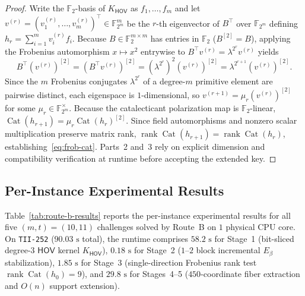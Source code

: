 \documentclass[11pt,a4paper]{article}
\theoremstyle{definition}
\theoremstyle{remark}
\newcommand{\F}{\mathbb{F}}
\newcommand{\rk}{\operatorname{rank}}
\newcommand{\Cat}{\operatorname{Cat}}
\newcommand{\HOV}{\mathsf{HOV}}
\begin{document}
\begin{proof}
Write the $\F_2$-basis of $K_{\HOV}$ as $f_1, \dots, f_m$ and let $v^{(r)} = (v^{(r)}_1, \dots, v^{(r)}_m)^\top \in \F_{2^m}^m$ be the $r$-th eigenvector of $B^\top$ over $\F_{2^m}$ defining $h_r = \sum_{i=1}^m v^{(r)}_i f_i$. Because $B \in \F_2^{m \times m}$ has entries in $\F_2$ ($B^{[2]} = B$), applying the Frobenius automorphism $x \mapsto x^2$ entrywise to $B^\top v^{(r)} = \lambda^{2^r} v^{(r)}$ yields
\[
    B^\top (v^{(r)})^{[2]} = (B^\top v^{(r)})^{[2]} = (\lambda^{2^r})^2 (v^{(r)})^{[2]} = \lambda^{2^{r+1}} (v^{(r)})^{[2]}.
\]
Since the $m$ Frobenius conjugates $\lambda^{2^r}$ of a degree-$m$ primitive element are pairwise distinct, each eigenspace is $1$-dimensional, so $v^{(r+1)} = \mu_r (v^{(r)})^{[2]}$ for some $\mu_r \in \F_{2^m}^\times$. Because the catalecticant polarization map is $\F_2$-linear, $\Cat(h_{r+1}) = \mu_r \Cat(h_r)^{[2]}$. Since field automorphisms and nonzero scalar multiplication preserve matrix rank, $\rk\Cat(h_{r+1}) = \rk\Cat(h_r)$, establishing~\eqref{eq:frob-cat}. Parts~2 and~3 rely on explicit dimension and compatibility verification at runtime before accepting the extended key.
\end{proof}

\subsection{Per-Instance Experimental Results}
Table~\ref{tab:route-b-results} reports the per-instance experimental results for all five $(m, t) = (10, 11)$ challenges solved by Route~B on $1$ physical CPU core. On \texttt{TII-252} ($90.03\text{ s}$ total), the runtime comprises $58.2\text{ s}$ for Stage~1 (bit-sliced degree-$3$ $\HOV$ kernel $K_{\HOV}$), $0.18\text{ s}$ for Stage~2 ($1\text{--}2$ block incremental $E_\beta$ stabilization), $1.85\text{ s}$ for Stage~3 (single-direction Frobenius rank test $\rk\Cat(h_0) = 9$), and $29.8\text{ s}$ for Stages~4--5 ($450$-coordinate fiber extraction and $O(n)$ support extension).
\end{document}
